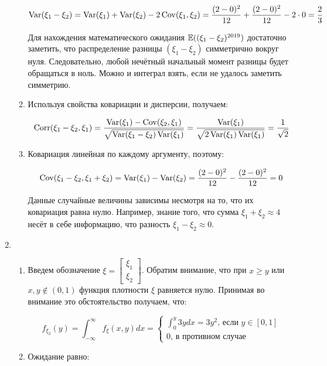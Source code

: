 \begin{enumerate}
\begin{enumerate}
\[
\operatorname{Var}(\xi_{1}-\xi_{2}) = \operatorname{Var}(\xi_{1}) + \operatorname{Var}(\xi_{2}) - 2\operatorname{Cov}(\xi_{1}, \xi_{2}) = 
\frac{(2-0)^2}{12} + \frac{(2-0)^2}{12} - 2 \cdot 0 = \frac{2}{3}
\]

Для нахождения математического ожидания $\operatorname{\mathbb{E}}((\xi_1 - \xi_2)^{2019})$ достаточно заметить, 
что распределение разницы $(\xi_1 - \xi_2)$ симметрично вокруг нуля.  
Следовательно, любой нечётный начальный момент разницы будет обращаться в ноль. 
Можно и интеграл взять, если не удалось заметить симметрию. 

\item Используя свойства ковариации и дисперсии, получаем:

\[
	\operatorname{Corr}(\xi_{1}-\xi_{2},\xi_{1}) 
	= 
	\frac{\operatorname{Var}(\xi_{1}) - \operatorname{Cov}(\xi_{2},\xi_{1})}{\sqrt{\operatorname{Var}(\xi_{1}-\xi_{2})\operatorname{Var}(\xi_{1})}}
	=
	\frac{\operatorname{Var}(\xi_1)}{\sqrt{2\operatorname{Var}(\xi_1) \operatorname{Var}(\xi_1)}} 
	= 
	\frac{1}{\sqrt{2}}
\]

\item Ковариация линейная по каждому аргументу, поэтому:

\[
	\operatorname{Cov}(\xi_{1} - \xi_{2}, \xi_{1} + \xi_{2}) =
	\operatorname{Var}(\xi_{1}) - \operatorname{Var}(\xi_{2}) = 
	\frac{(2-0)^2}{12}-\frac{(2-0)^2}{12} = 0
\]

Данные случайные величины зависимы несмотря на то, что их ковариация равна нулю.
Например, знание того, что сумма $\xi_1 + \xi_2 \approx 4$ несёт в себе информацию,
что разность $\xi_1 - \xi_2 \approx 0$. 

\end{enumerate}



\item 
\begin{enumerate}

\item Введем обозначение $\xi=\begin{bmatrix}\xi_{1}\\ \xi_{2}\end{bmatrix}$. Обратим внимание, что при $x\geq y$ или $x,y\notin(0,1)$ функция плотности $\xi$ равняется нулю. Принимая во внимание это обстоятельство получаем, что:

\[f_{\xi_{2}}(y)=\int_{-\infty}^{\infty}f_{\xi}(x,y)dx=\begin{cases}\int_{0}^{y}3ydx=3y^2\text{, если }y\in[0,1]\\0\text{, в противном случае}\end{cases}\]

\item Ожидание равно:


\end{enumerate}
\end{enumerate}
